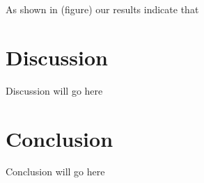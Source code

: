 \documentclass{sigchi}
\begin{document}
As shown in (figure) our results indicate that 

\section{Discussion}

Discussion will go here

\section{Conclusion}

Conclusion will go here

%
%
%
%
%
\balance




\end{document}
